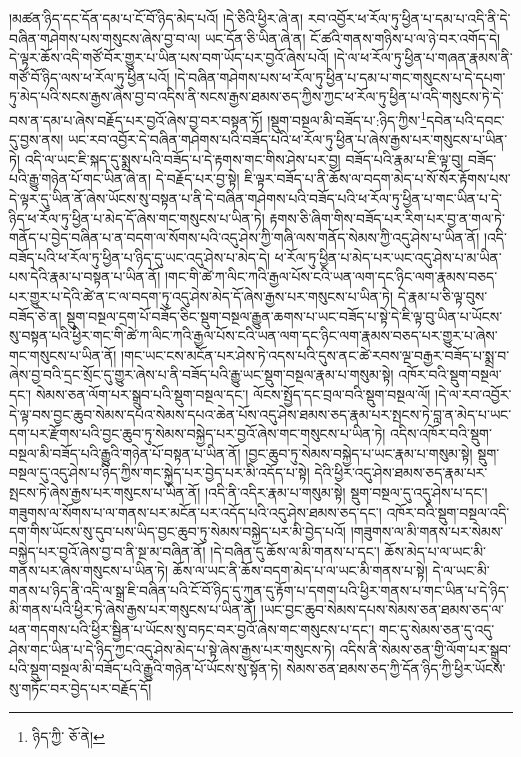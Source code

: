 །མཚན་ཉིད་དང་དོན་དམ་པ་ངོ་བོ་ཉིད་མེད་པའོ། །དེ་ཅིའི་ཕྱིར་ཞེ་ན། རབ་འབྱོར་ཕ་རོལ་ཏུ་ཕྱིན་པ་དམ་པ་འདི་ནི་དེ་བཞིན་གཤེགས་པས་གསུངས་ཞེས་བྱ་བ་ལ། ཡང་དོན་ཅི་ཡིན་ཞེ་ན། ངོ་ཚའི་གནས་གཉིས་པ་ལ་ཉེ་བར་འགོད་དེ། དེ་ལྟར་ཆོས་འདི་གཙོ་བོར་གྱུར་པ་ཡིན་པས་བག་ཡོད་པར་བྱའོ་ཞེས་པའོ། །དེ་ལ་ཕ་རོལ་ཏུ་ཕྱིན་པ་གཞན་རྣམས་ནི་གཙོ་བོ་ཉིད་ལས་ཕ་རོལ་ཏུ་ཕྱིན་པའོ། །དེ་བཞིན་གཤེགས་པས་ཕ་རོལ་ཏུ་ཕྱིན་པ་དམ་པ་གང་གསུངས་པ་དེ་དཔག་ཏུ་མེད་པའི་སངས་རྒྱས་ཞེས་བྱ་བ་འདིས་ནི་སངས་རྒྱས་ཐམས་ཅད་ཀྱིས་ཀྱང་ཕ་རོལ་ཏུ་ཕྱིན་པ་འདི་གསུངས་ཏེ་དེ་བས་ན་དམ་པ་ཞེས་བརྗོད་པར་བྱའོ་ཞེས་བྱ་བར་བསྟན་ཏོ། །སྡུག་བསྔལ་མི་བཟོད་པ་:ཉིད་ཀྱིས་\footnote{ཉིད་ཀྱི་  ཅོ་ནེ། }དབེན་པའི་དབང་དུ་བྱས་ནས། ཡང་རབ་འབྱོར་དེ་བཞིན་གཤེགས་པའི་བཟོད་པའི་ཕ་རོལ་ཏུ་ཕྱིན་པ་ཞེས་རྒྱས་པར་གསུངས་པ་ཡིན་ཏེ། འདི་ལ་ཡང་ཇི་སྐད་དུ་སྨྲས་པའི་བཟོད་པ་དེ་རྟགས་གང་གིས་ཤེས་པར་བྱ། བཟོད་པའི་རྣམ་པ་ཇི་ལྟ་བུ། བཟོད་པའི་རྒྱུ་གཉེན་པོ་གང་ཡིན་ཞེ་ན། དེ་བརྗོད་པར་བྱ་སྟེ། ཇི་ལྟར་བཟོད་པ་ནི་ཆོས་ལ་བདག་མེད་པ་སོ་སོར་རྟོགས་པས་དེ་ལྟར་དུ་ཡིན་ནོ་ཞེས་ཡོངས་སུ་བསྟན་པ་ནི་དེ་བཞིན་གཤེགས་པའི་བཟོད་པའི་ཕ་རོལ་ཏུ་ཕྱིན་པ་གང་ཡིན་པ་དེ་ཉིད་ཕ་རོལ་ཏུ་ཕྱིན་པ་མེད་དོ་ཞེས་གང་གསུངས་པ་ཡིན་ཏེ། རྟགས་ཅི་ཞིག་གིས་བཟོད་པར་རིག་པར་བྱ་ན་གལ་ཏེ་གནོད་པ་བྱེད་བཞིན་པ་ན་བདག་ལ་སོགས་པའི་འདུ་ཤེས་ཀྱི་གཞི་ལས་གནོད་སེམས་ཀྱི་འདུ་ཤེས་པ་ཡིན་ནོ། །འདི་བཟོད་པའི་ཕ་རོལ་ཏུ་ཕྱིན་པ་ཉིད་དུ་ཡང་འདུ་ཤེས་པ་མེད་དེ། ཕ་རོལ་ཏུ་ཕྱིན་པ་མེད་པར་ཡང་འདུ་ཤེས་པ་མ་ཡིན་པས་དེའི་རྣམ་པ་བསྟན་པ་ཡིན་ནོ། །གང་གི་ཚེ་ཀ་ལིང་ཀའི་རྒྱལ་པོས་ངའི་ཡན་ལག་དང་ཉིང་ལག་རྣམས་བཅད་པར་གྱུར་པ་དེའི་ཚེ་ན་ང་ལ་བདག་ཏུ་འདུ་ཤེས་མེད་དོ་ཞེས་རྒྱས་པར་གསུངས་པ་ཡིན་ཏེ། དེ་རྣམ་པ་ཅི་ལྟ་བུས་བཟོད་ཅེ་ན། སྡུག་བསྔལ་དྲག་པོ་བཟོད་ཅིང་སྡུག་བསྔལ་རྒྱུན་ཆགས་པ་ཡང་བཟོད་པ་སྟེ་དེ་ཇི་ལྟ་བུ་ཡིན་པ་ཡོངས་སུ་བསྟན་པའི་ཕྱིར་གང་གི་ཚེ་ཀ་ལིང་ཀའི་རྒྱལ་པོས་ངའི་ཡན་ལག་དང་ཉིང་ལག་རྣམས་བཅད་པར་གྱུར་པ་ཞེས་གང་གསུངས་པ་ཡིན་ནོ། །གང་ཡང་ངས་མངོན་པར་ཤེས་ཏེ་འདས་པའི་དུས་ནང་ཚེ་རབས་ལྔ་བརྒྱར་བཟོད་པ་སྨྲ་བ་ཞེས་བྱ་བའི་དྲང་སྲོང་དུ་གྱུར་ཞེས་པ་ནི་བཟོད་པའི་རྒྱུ་ཡང་སྡུག་བསྔལ་རྣམ་པ་གསུམ་སྟེ། འཁོར་བའི་སྡུག་བསྔལ་དང་། སེམས་ཅན་ལོག་པར་སྒྲུབ་པའི་སྡུག་བསྔལ་དང་། ལོངས་སྤྱོད་དང་བྲལ་བའི་སྡུག་བསྔལ་ལོ། །དེ་ལ་རབ་འབྱོར་དེ་ལྟ་བས་བྱང་ཆུབ་སེམས་དཔའ་སེམས་དཔའ་ཆེན་པོས་འདུ་ཤེས་ཐམས་ཅད་རྣམ་པར་སྤངས་ཏེ་བླ་ན་མེད་པ་ཡང་དག་པར་རྫོགས་པའི་བྱང་ཆུབ་ཏུ་སེམས་བསྐྱེད་པར་བྱའོ་ཞེས་གང་གསུངས་པ་ཡིན་ཏེ། འདིས་འཁོར་བའི་སྡུག་བསྔལ་མི་བཟོད་པའི་རྒྱུའི་གཉེན་པོ་བསྟན་པ་ཡིན་ནོ། །བྱང་ཆུབ་ཏུ་སེམས་བསྐྱེད་པ་ཡང་རྣམ་པ་གསུམ་སྟེ། སྡུག་བསྔལ་དུ་འདུ་ཤེས་པ་ཉིད་ཀྱིས་གང་སྐྱེད་པར་བྱེད་པར་མི་འདོད་པ་སྟེ། དེའི་ཕྱིར་འདུ་ཤེས་ཐམས་ཅད་རྣམ་པར་སྤངས་ཏེ་ཞེས་རྒྱས་པར་གསུངས་པ་ཡིན་ནོ། །འདི་ནི་འདིར་རྣམ་པ་གསུམ་སྟེ། སྡུག་བསྔལ་དུ་འདུ་ཤེས་པ་དང་། གཟུགས་ལ་སོགས་པ་ལ་གནས་པར་མངོན་པར་འདོད་པའི་འདུ་ཤེས་ཐམས་ཅད་དང་། འཁོར་བའི་སྡུག་བསྔལ་འདི་དག་གིས་ཡོངས་སུ་དུབ་པས་ཡིད་བྱང་ཆུབ་ཏུ་སེམས་བསྐྱེད་པར་མི་བྱེད་པའོ། །གཟུགས་ལ་མི་གནས་པར་སེམས་བསྐྱེད་པར་བྱའོ་ཞེས་བྱ་བ་ནི་སྔ་མ་བཞིན་ནོ། །དེ་བཞིན་དུ་ཆོས་ལ་མི་གནས་པ་དང་། ཆོས་མེད་པ་ལ་ཡང་མི་གནས་པར་ཞེས་གསུངས་པ་ཡིན་ཏེ། ཆོས་ལ་ཡང་ནི་ཆོས་བདག་མེད་པ་ལ་ཡང་མི་གནས་པ་སྟེ། དེ་ལ་ཡང་མི་གནས་པ་ཉིད་ནི་འདི་ལ་སྒྲ་ཇི་བཞིན་པའི་ངོ་བོ་ཉིད་དུ་ཀུན་དུ་རྟོག་པ་དགག་པའི་ཕྱིར་གནས་པ་གང་ཡིན་པ་དེ་ཉིད་མི་གནས་པའི་ཕྱིར་ཏེ་ཞེས་རྒྱས་པར་གསུངས་པ་ཡིན་ནོ། །ཡང་བྱང་ཆུབ་སེམས་དཔས་སེམས་ཅན་ཐམས་ཅད་ལ་ཕན་གདགས་པའི་ཕྱིར་སྦྱིན་པ་ཡོངས་སུ་བཏང་བར་བྱའོ་ཞེས་གང་གསུངས་པ་དང་། གང་དུ་སེམས་ཅན་དུ་འདུ་ཤེས་གང་ཡིན་པ་དེ་ཉིད་ཀྱང་འདུ་ཤེས་མེད་པ་སྟེ་ཞེས་རྒྱས་པར་གསུངས་ཏེ། འདིས་ནི་སེམས་ཅན་གྱི་ལོག་པར་སྒྲུབ་པའི་སྡུག་བསྔལ་མི་བཟོད་པའི་རྒྱུའི་གཉེན་པོ་ཡོངས་སུ་སྟོན་ཏེ། སེམས་ཅན་ཐམས་ཅད་ཀྱི་དོན་ཉིད་ཀྱི་ཕྱིར་ཡོངས་སུ་གཏོང་བར་བྱེད་པར་བརྗོད་དོ། 